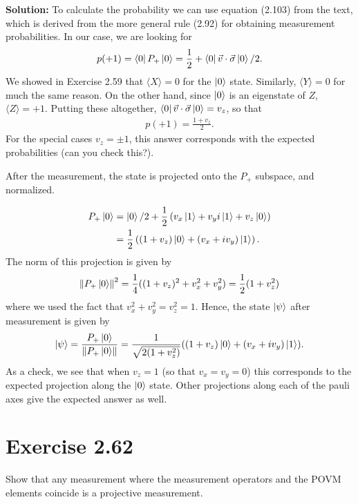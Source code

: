 \documentclass{book}
\begin{document}
    \textbf{Solution:} To calculate the probability we can use equation (2.103) from the text, which is derived from the more general rule (2.92) for obtaining measurement probabilities. In our case, we are looking for
    \begin{align}
        p(+1) = \bra{0} P_+ \ket{0} = \frac{1}{2} + \bra{0}\vec{v} \cdot \vec{\sigma}\ket{0}/2.
    \end{align}
    We showed in Exercise 2.59 that $\langle X \rangle = 0$ for the $\ket{0}$ state. Similarly, $\langle Y \rangle = 0$ for much the same reason. On the other hand, since $\ket{0}$ is an eigenstate of $Z$, $\langle Z \rangle = +1$. Putting these altogether, $\bra{0}\vec{v} \cdot \vec{\sigma}\ket{0} = v_z$, so that 
    \begin{align}
        p(+1) = \frac{1 + v_z}{2}.
    \end{align}
    For the special cases $v_z = \pm 1$, this answer corresponds with the expected probabilities (can you check this?). 

    After the measurement, the state is projected onto the $P_+$ subspace, and normalized. 

    \begin{align}
    \begin{aligned}
        P_+ \ket{0} &= \ket{0}/2 + \frac{1}{2} \left(v_x \ket{1} + v_y i \ket{1} + v_z \ket
        0\right) \\
        &= \frac{1}{2} \left((1+v_z)\ket{0} + (v_x + i v_y) \ket{1}\right).
    \end{aligned}
    \end{align}
    The norm of this projection is given by
    \begin{align}
        \norm{P_+ \ket{0}}^2 = \frac{1}{4} ((1+v_z)^2 + v_x^2 + v_y^2) = \frac{1}{2}(1+v_z^2)
    \end{align}
    where we used the fact that $v_x^2 + v_y^2 = v_z^2 = 1$. Hence, the state $\ket{\psi}$ after measurement is given by
    \begin{align}
        \ket{\psi} = \frac{P_+ \ket{0}}{\norm{P_+ \ket{0}}} = \frac{1}{\sqrt{2(1+v_z^2)}}((1+v_z)\ket{0} + (v_x + i v_y)\ket{1}).
    \end{align}
    As a check, we see that when $v_z = 1$ (so that $v_x = v_y = 0$) this corresponds to the expected projection along the $\ket{0}$ state. Other projections along each of the pauli axes give the expected answer as well.

\section*{Exercise 2.62}
    Show that any measurement where the measurement operators and the POVM elements coincide is a projective measurement.
\end{document}
